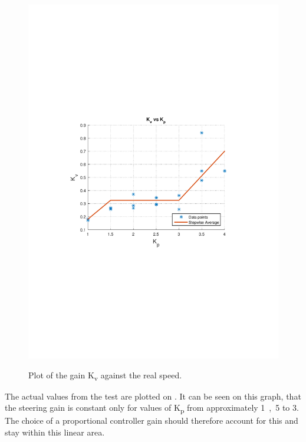 \begin{figure}[H]
  \centering
  {
    \includegraphics[width=1.2\textwidth]{figures/KvKpSteeringtest.pdf}
  }
  \caption{Plot of the gain \si{K_v} against the real speed.}
  \label{fig:steeringPlotKsteeringVsKp}
\end{figure}
%
The actual values from the test are plotted on . It can be seen on this graph, that the steering gain is constant only for values of \si{K_p} from approximately \si{1,5} to \si{3}. The choice of a proportional controller gain should therefore account for this and stay within this linear area.